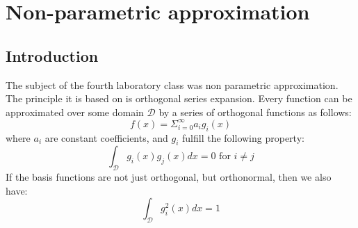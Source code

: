 \chapter{Non-parametric approximation}
\section{Introduction}
The subject of the fourth laboratory class was non parametric approximation. 
The principle it is based on is orthogonal series expansion. Every function
can be approximated over some domain $\mathcal{D}$ by a series of orthogonal functions as follows:
\begin{equation}
    \label{serexp}
    f(x) = \Sigma_{i=0}^{\infty} a_i g_i(x)
\end{equation}
where $a_i$ are constant coefficients, and $g_i$ fulfill the following property:
\begin{equation}
    \label{ort}
    \int_{\mathcal{D}} g_i(x) g_j(x) dx = 0 \text{ for }i \neq j
\end{equation}
If the basis functions are not just orthogonal, but orthonormal, then we also have:
\begin{equation}
    \label{nor}
    \int_{\mathcal{D}} g_i^{2}(x)dx = 1
\end{equation}

